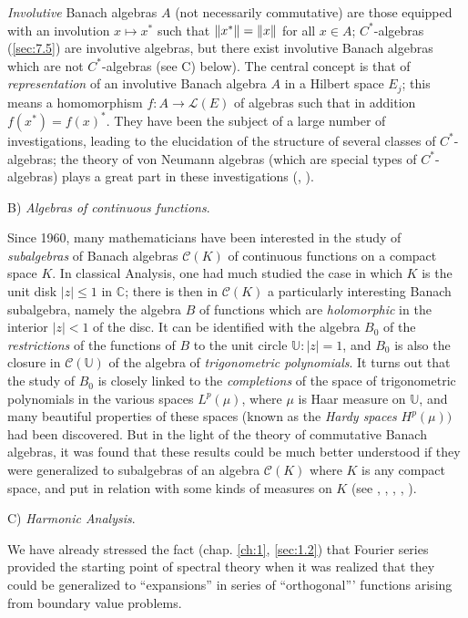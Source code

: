 \documentclass[12pt,a4paper,leqno,twoside]{extbook}
\DeclarePairedDelimiter{\norm}{\lVert}{\rVert}
\newcommand{\Cont}{\mathcal{C}}
\newcommand{\C}{\mathbb{C}}
\begin{document}
\emph{Involutive} Banach algebras \(A\) (not necessarily commutative) are those equipped with an involution \(x \mapsto x^*\) such that \(\norm{x^*} = \norm{x}\) for all \(x \in A\); \(C^*\)-algebras (\ref{sec:7.5}) are involutive algebras, but there exist involutive Banach algebras which are not \(C^*\)-algebras (see C) below). The central concept is that of \emph{representation} of an involutive Banach algebra \(A\) in a Hilbert space \(E_j\); this means a homomorphism \(f: A \to \mathcal{L}(E)\) of algebras such that in addition \(f(x^*) = f(x)^*\). They have been the subject of a large number of investigations, leading to the elucidation of the structure of several classes of \(C^*\)-algebras; the theory of von Neumann algebras (which are special types of \(C^*\)-algebras) plays a great part in these investigations (\cite{058}, \cite{036}).

B) \emph{Algebras of continuous functions}.

Since 1960, many mathematicians have been interested in the study of \emph{subalgebras} of Banach algebras \(\Cont(K)\) of continuous functions on a compact space \(K\). In classical Analysis, one had much studied the case in which \(K\) is the unit disk \(|z| \leq 1\) in \(\C\); there is then in \(\Cont(K)\) a particularly interesting Banach subalgebra, namely the algebra \(B\) of functions which are \emph{holomorphic} in the interior \(|z| < 1\) of the disc. It can be identified with the algebra \(B_0\) of the \emph{restrictions} of the functions of \(B\) to the unit circle \(\mathbb{U}: |z| = 1\), and \(B_0\) is also the closure in \(\Cont(\mathbb{U})\) of the algebra of \emph{trigonometric polynomials}. It turns out that the study of \(B_0\) is closely linked to the \emph{completions} of the space of trigonometric polynomials in the various spaces \(L^p(\mu)\), where \(\mu\) is Haar measure on \(\mathbb{U}\), and many beautiful properties of these spaces (known as the \emph{Hardy spaces} \(H^p(\mu))\) had been discovered. But in the light of the theory of commutative Banach algebras, it was found that these results could be much better understood if they were generalized to subalgebras of an algebra \(\Cont(K)\) where \(K\) is any compact space, and put in relation with some kinds of measures on \(K\) (see \cite{018}, \cite{033}, \cite{079}, \cite{116}, \cite{140}).

C) \emph{Harmonic Analysis}.

We have already stressed the fact (chap. \ref{ch:1}, \ref{sec:1.2}) that Fourier series provided the starting point of spectral theory when it was realized that they could be generalized to ``expansions'' in series of ``orthogonal''' functions arising from boundary value problems.
\end{document}
